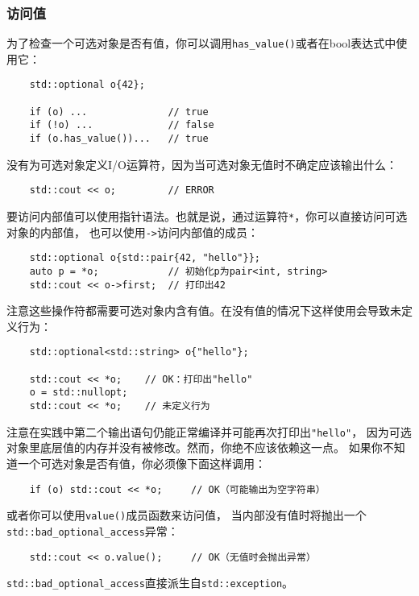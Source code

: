 \subsubsection{访问值}
为了检查一个可选对象是否有值，你可以调用\texttt{has\_value()}或者在bool表达式中使用它：
\begin{lstlisting}
    std::optional o{42};

    if (o) ...              // true
    if (!o) ...             // false
    if (o.has_value())...   // true
\end{lstlisting}
没有为可选对象定义I/O运算符，因为当可选对象无值时不确定应该输出什么：
\begin{lstlisting}
    std::cout << o;         // ERROR
\end{lstlisting}
要访问内部值可以使用指针语法。也就是说，通过运算符\texttt{*}，你可以直接访问可选对象的内部值，
也可以使用\texttt{->}访问内部值的成员：
\begin{lstlisting}
    std::optional o{std::pair{42, "hello"}};
    auto p = *o;            // 初始化p为pair<int, string>
    std::cout << o->first;  // 打印出42
\end{lstlisting}
注意这些操作符都需要可选对象内含有值。在没有值的情况下这样使用会导致未定义行为：
\begin{lstlisting}
    std::optional<std::string> o{"hello"};

    std::cout << *o;    // OK：打印出"hello"
    o = std::nullopt;
    std::cout << *o;    // 未定义行为
\end{lstlisting}
注意在实践中第二个输出语句仍能正常编译并可能再次打印出\texttt{"hello"}，
因为可选对象里底层值的内存并没有被修改。然而，你绝不应该依赖这一点。
如果你不知道一个可选对象是否有值，你必须像下面这样调用：
\begin{lstlisting}
    if (o) std::cout << *o;     // OK（可能输出为空字符串）
\end{lstlisting}
或者你可以使用\texttt{value()}成员函数来访问值，
当内部没有值时将抛出一个\texttt{std::bad\_optional\_access}异常：
\begin{lstlisting}
    std::cout << o.value();     // OK（无值时会抛出异常）
\end{lstlisting}
\texttt{std::bad\_optional\_access}直接派生自\texttt{std::exception}。


